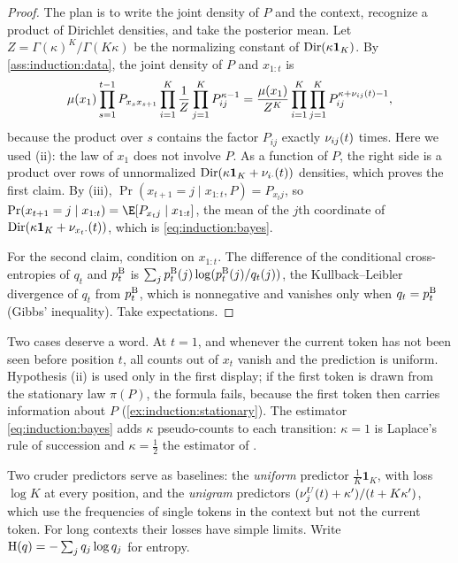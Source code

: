 \begin{refsection}
\begin{proof}
The plan is to write the joint density of $P$ and the context, recognize a product of Dirichlet densities, and take the posterior mean. Let $Z=\Gamma(\kappa)^K/\Gamma(K\kappa)$ be the normalizing constant of $\operatorname{Dir}(\kappa\mathbf1_K)$. By \cref{ass:induction:data}, the joint density of $P$ and $x_{1:t}$ is
\[
  \mu(x_1)\prod_{s=1}^{t-1}P_{x_sx_{s+1}}\prod_{i=1}^K\frac1Z\prod_{j=1}^KP_{ij}^{\kappa-1}=\frac{\mu(x_1)}{Z^K}\prod_{i=1}^K\prod_{j=1}^KP_{ij}^{\kappa+\nu_{ij}(t)-1},
\]
because the product over $s$ contains the factor $P_{ij}$ exactly $\nu_{ij}(t)$ times. Here we used (ii): the law of $x_1$ does not involve $P$. As a function of $P$, the right side is a product over rows of unnormalized $\operatorname{Dir}(\kappa\mathbf1_K+\nu_{i\cdot}(t))$ densities, which proves the first claim. By (iii), $\Pr(x_{t+1}=j\mid x_{1:t},P)=P_{x_tj}$, so $\Pr(x_{t+1}=j\mid x_{1:t})=\E[P_{x_tj}\mid x_{1:t}]$, the mean of the $j$th coordinate of $\operatorname{Dir}(\kappa\mathbf1_K+\nu_{x_t\cdot}(t))$, which is \eqref{eq:induction:bayes}.

For the second claim, condition on $x_{1:t}$. The difference of the conditional cross-entropies of $q_t$ and $p^{\mathrm{B}}_t$ is $\sum_jp^{\mathrm{B}}_t(j)\log(p^{\mathrm{B}}_t(j)/q_t(j))$, the Kullback--Leibler divergence of $q_t$ from $p^{\mathrm{B}}_t$, which is nonnegative and vanishes only when $q_t=p^{\mathrm{B}}_t$ (Gibbs' inequality). Take expectations.
\end{proof}

Two cases deserve a word. At $t=1$, and whenever the current token has not been seen before position $t$, all counts out of $x_t$ vanish and the prediction is uniform. Hypothesis (ii) is used only in the first display; if the first token is drawn from the stationary law $\pi(P)$, the formula fails, because the first token then carries information about $P$ (\cref{ex:induction:stationary}). The estimator \eqref{eq:induction:bayes} adds $\kappa$ pseudo-counts to each transition: $\kappa=1$ is Laplace's rule of succession and $\kappa=\frac12$ the estimator of \textcite{KrichevskyTrofimov1981}.

Two cruder predictors serve as baselines: the \emph{uniform} predictor $\frac1K\mathbf1_K$, with loss $\log K$ at every position, and the \emph{unigram} predictors $(\nu^U_j(t)+\kappa')/(t+K\kappa')$, which use the frequencies of single tokens in the context but not the current token. For long contexts their losses have simple limits. Write $\mathrm{H}(q)=-\sum_jq_j\log q_j$ for entropy.


\end{refsection}
